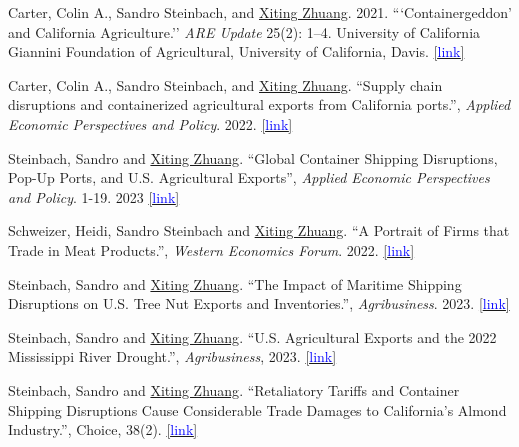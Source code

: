 \documentclass[11 pt,letterpaper]{article}
\renewenvironment{itemize}{
	\begin{list}{}{
			\setlength{\leftmargin}{1.5em}
		}
	}{
	\end{list}
}
\begin{document}
		\begin{itemize}
 
 
 \item[-] Carter, Colin A., Sandro Steinbach, and \underline{Xiting Zhuang}. 2021. ```Containergeddon’ and California Agriculture.'' \textit{ARE Update} 25(2): 1–4. University of California Giannini Foundation of Agricultural, University of California, Davis.  \href{https://s.giannini.ucop.edu/uploads/pub/2021/12/20/v25n2_1.pdf}{[{\underline{\textcolor{blue}{link}}}]}
 
 \item[-]  Carter, Colin A., Sandro Steinbach, and \underline{Xiting Zhuang}. ``Supply chain disruptions and containerized agricultural exports from California ports.'', \textit{Applied Economic Perspectives and Policy}. 2022. 
 \href{https://doi.org/10.1002/aepp.13311}{[{\underline{\textcolor{blue}{link}}}]}
 
 	 \item[-]   Steinbach, Sandro and \underline{Xiting Zhuang}. ``Global Container Shipping Disruptions, Pop-Up Ports, and U.S. Agricultural Exports'', \textit{Applied Economic Perspectives and Policy}. 1-19. 2023 
 \href{http://doi.org/10.1002/aepp.13399}{[{\underline{\textcolor{blue}{link}}}]}
 
 
 
		 \item[-] 	Schweizer, Heidi, Sandro Steinbach and  \underline{Xiting Zhuang}. ``A Portrait of Firms that Trade in Meat Products.'', \textit{Western Economics Forum}. 2022.  \href{https://waeaonline.org/wp-content/uploads/2022/12/WEF-Fall-2022-Issue-20-Volume-2-All-Intro-and-Articles.pdf#page=6}{[{\underline{\textcolor{blue}{link}}}]}
 
 
     	\item[-] Steinbach, Sandro and  \underline{Xiting Zhuang}. ``The Impact of Maritime Shipping Disruptions on U.S. Tree Nut Exports and Inventories.'', \textit{Agribusiness}. 2023.  
 	\href{https://doi.org/10.1002/agr.21809}{[{\underline{\textcolor{blue}{link}}}]}
	
	
		
	\item[-] Steinbach, Sandro and  \underline{Xiting Zhuang}. ``U.S. Agricultural Exports and the 2022 Mississippi River Drought.'', \textit{Agribusiness}, 2023.    	\href{https://ageconsearch.umn.edu/record/335476/files/26473.pdf}{[{\underline{\textcolor{blue}{link}}}]}
	
	
	
	\item[-] Steinbach, Sandro and  \underline{Xiting Zhuang}. ``Retaliatory Tariffs and Container Shipping Disruptions Cause Considerable Trade Damages to California’s Almond Industry.'', Choice, 38(2).  	\href{https://econpapers.repec.org/scripts/redir.pf?u=https%3A%2F%2Fageconsearch.umn.edu%2Frecord%2F337188%2Ffiles%2FSteinbach_Retaliatory_38.pdf;h=repec:ags:aaeach:337188}{[{\underline{\textcolor{blue}{link}}}]}
		 	

\end{itemize}
\end{document}
